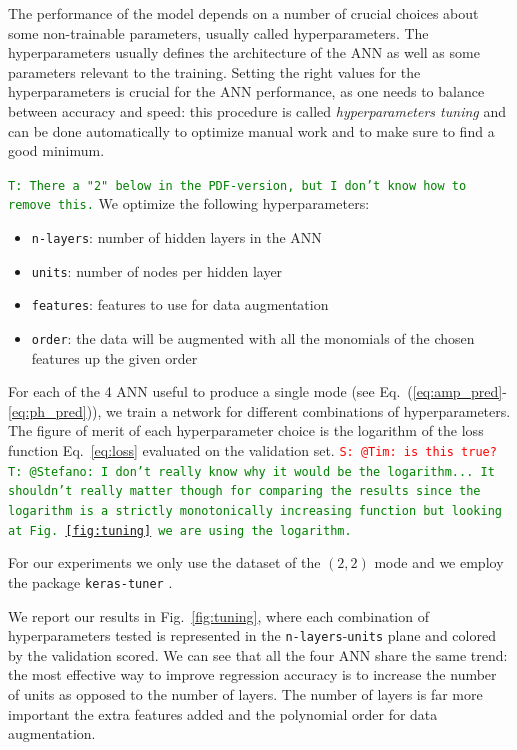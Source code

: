 \documentclass[twocolumn,showpacs,preprintnumbers,nofootinbib,prd,
superscriptaddress,10pt]{revtex4-1}
\newcommand{\stefano}[1]{{\textcolor{red}{\texttt{S: #1}} }}
\newcommand{\tim}[1]{{\textcolor{green}{\texttt{T: #1}} }}
\begin{document}
The performance of the model depends on a number of crucial choices about some non-trainable parameters, usually called hyperparameters. The hyperparameters usually defines the architecture of the ANN as well as some parameters relevant to the training.
Setting the right values for the hyperparameters is crucial for the ANN performance, as one needs to balance between accuracy and speed: this procedure is called {\it hyperparameters tuning} and can be done automatically to optimize manual work and to make sure to find a good minimum.

\tim{There a "2" below in the PDF-version, but I don't know how to remove this.}
We optimize the following hyperparameters:
\begin{multicols}{2}
	\begin{itemize}
		\item \texttt{n-layers}: number of hidden layers in the ANN
		\item \texttt{units}: number of nodes per hidden layer
		\item \texttt{features}: features to use for data augmentation
		\item \texttt{order}: the data will be augmented with all the monomials of the chosen features up the given order
	\end{itemize}
\end{multicols}

For each of the 4 ANN useful to produce a single mode (see Eq.~(\ref{eq:amp_pred}-\ref{eq:ph_pred})), we train a network for different combinations of hyperparameters. The figure of merit of each hyperparameter choice is the logarithm of the loss function Eq.~\eqref{eq:loss} evaluated on the validation set. \stefano{@Tim: is this true?} \tim{@Stefano: I don't really know why it would be the logarithm... It shouldn't really matter though for comparing the results since the logarithm is a strictly monotonically increasing function but looking at Fig.~\ref{fig:tuning} we are using the logarithm.}

For our experiments we only use the dataset of the $(2,2)$ mode and we employ the package \texttt{keras-tuner} \cite{omalley2019kerastuner}.

We report our results in Fig.~\ref{fig:tuning}, where each combination of hyperparameters tested is represented in the \texttt{n-layers}-\texttt{units} plane and colored by the validation scored. 
We can see that all the four ANN share the same trend: the most effective way to improve regression accuracy is to increase the number of units as opposed to the number of layers.
The number of layers is far more important the extra features added and the polynomial order for data augmentation.
\end{document}
